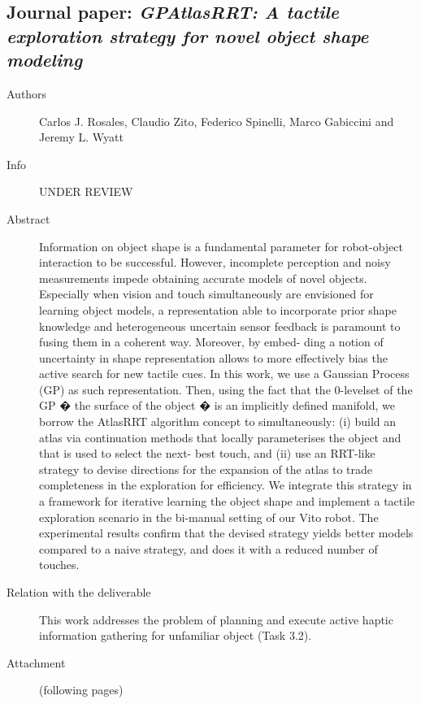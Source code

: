 \documentclass[a4paper,11pt,pdf]{../templates/pacmanreport}
\begin{document}
\subsection{Journal paper: \em GPAtlasRRT: A tactile exploration strategy for novel object shape modeling}
\begin{description}
    \item[Authors] Carlos J. Rosales, Claudio Zito, Federico Spinelli, Marco Gabiccini and Jeremy L. Wyatt
    \item[Info] UNDER REVIEW %
    \item[Abstract] Information on object shape is a fundamental parameter for robot-object interaction to be successful. However, incomplete perception and noisy measurements impede obtaining accurate models of novel objects. Especially when vision and touch simultaneously are envisioned for learning object models, a representation able to incorporate prior shape knowledge and heterogeneous uncertain sensor feedback is paramount to fusing them in a coherent way. Moreover, by embed- ding a notion of uncertainty in shape representation allows to more effectively bias the active search for new tactile cues. In this work, we use a Gaussian Process (GP) as such representation. Then, using the fact that the 0-levelset of the GP � the surface of the object � is an implicitly defined manifold, we borrow the AtlasRRT algorithm concept to simultaneously: (i) build an atlas via continuation methods that locally parameterises the object and that is used to select the next- best touch, and (ii) use an RRT-like strategy to devise directions for the expansion of the atlas to trade completeness in the exploration for efficiency. We integrate this strategy in a framework for iterative learning the object shape and implement a tactile exploration scenario in the bi-manual setting of our Vito robot. The experimental results confirm that the devised strategy yields better models compared to a naive strategy, and does it with a reduced number of touches.
    
    \item [Relation with the deliverable] This work addresses the problem of planning and execute active haptic information gathering for unfamiliar object (Task 3.2).
    \item[Attachment] (following pages) %
\end{description}

\end{document}
